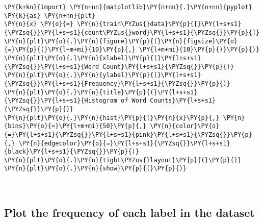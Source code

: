 \documentclass[../main.tex]{subfiles}
\begin{document}
    \begin{tcolorbox}[breakable, size=fbox, boxrule=1pt, pad at break*=1mm,colback=cellbackground, colframe=cellborder]
\begin{Verbatim}[commandchars=\\\{\}]
\PY{k+kn}{import} \PY{n+nn}{matplotlib}\PY{n+nn}{.}\PY{n+nn}{pyplot} \PY{k}{as} \PY{n+nn}{plt}
\PY{n}{x} \PY{o}{=} \PY{n}{train\PYZus{}data}\PY{p}{[}\PY{l+s+s1}{\PYZsq{}}\PY{l+s+s1}{count\PYZus{}word}\PY{l+s+s1}{\PYZsq{}}\PY{p}{]}
\PY{n}{plt}\PY{o}{.}\PY{n}{figure}\PY{p}{(}\PY{n}{figsize}\PY{o}{=}\PY{p}{(}\PY{l+m+mi}{10}\PY{p}{,} \PY{l+m+mi}{10}\PY{p}{)}\PY{p}{)}
\PY{n}{plt}\PY{o}{.}\PY{n}{xlabel}\PY{p}{(}\PY{l+s+s1}{\PYZsq{}}\PY{l+s+s1}{Word Count}\PY{l+s+s1}{\PYZsq{}}\PY{p}{)}
\PY{n}{plt}\PY{o}{.}\PY{n}{ylabel}\PY{p}{(}\PY{l+s+s1}{\PYZsq{}}\PY{l+s+s1}{Frequency}\PY{l+s+s1}{\PYZsq{}}\PY{p}{)}
\PY{n}{plt}\PY{o}{.}\PY{n}{title}\PY{p}{(}\PY{l+s+s1}{\PYZsq{}}\PY{l+s+s1}{Histogram of Word Counts}\PY{l+s+s1}{\PYZsq{}}\PY{p}{)}
\PY{n}{plt}\PY{o}{.}\PY{n}{hist}\PY{p}{(}\PY{n}{x}\PY{p}{,} \PY{n}{bins}\PY{o}{=}\PY{l+m+mi}{50}\PY{p}{,} \PY{n}{color}\PY{o}{=}\PY{l+s+s1}{\PYZsq{}}\PY{l+s+s1}{pink}\PY{l+s+s1}{\PYZsq{}}\PY{p}{,} \PY{n}{edgecolor}\PY{o}{=}\PY{l+s+s1}{\PYZsq{}}\PY{l+s+s1}{black}\PY{l+s+s1}{\PYZsq{}}\PY{p}{)}
\PY{n}{plt}\PY{o}{.}\PY{n}{tight\PYZus{}layout}\PY{p}{(}\PY{p}{)}
\PY{n}{plt}\PY{o}{.}\PY{n}{show}\PY{p}{(}\PY{p}{)}
\end{Verbatim}
\end{tcolorbox}

    \begin{center}
    \end{center}
    { \hspace*{\fill} \\}
    
    \subsection{Plot the frequency of each label in the dataset}\label{plot-the-frequency-of-each-label-in-the-dataset}
\end{document}
